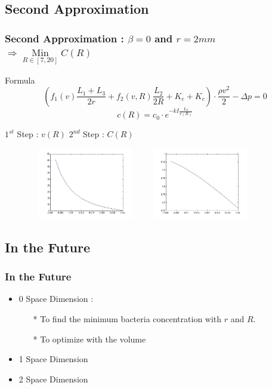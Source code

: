   \subsection{Second Approximation}
  \begin{frame}
  \frametitle{Second Approximation : $\beta = 0$ and $r=2mm$ $\Rightarrow \mathop{Min}\limits _{R\in [7,20]} C(R)$}
  \begin{block}{Formula}
  \begin{equation}
  \left(f_1(v)\frac{L_1+L_3}{2r} + f_2(v,R)\frac{L_2}{2R} + K_e + K_c\right)\cdot \frac{\rho v^2}{2} - \Delta p = 0
  \end{equation}
  \begin{equation}
  c(R) = c_0\cdot e^{-kI\frac{L_2}{v(R)}}
  \end{equation}
  \end{block}
  $1^{st}$ Step : $v(R)$ \hspace{40mm} $2^{nd}$ Step : $C(R)$
          \begin{figure}
          \raggedleft
          \includegraphics[height=3.1cm, width=5cm]{./images/graphVR.jpg}
          \hspace{5mm}
          \raggedright
          \includegraphics[height=3.1cm, width=5cm]{./images/graphCR.jpg}
          \end{figure}
  \end{frame}

  \subsection{In the Future}
  \begin{frame}
  \frametitle{In the Future}
  \begin{itemize}
  \item 0 Space Dimension :
          \begin{itemize} 
                  \item[*] To find the minimum bacteria concentration with $r$ and $R$.
                  \item[*] To optimize with the volume
          \end{itemize}
  \vspace{1cm}
  \item 1 Space Dimension
  \vspace{1cm}
  \item 2 Space Dimension

  \end{itemize}
  \end{frame}
